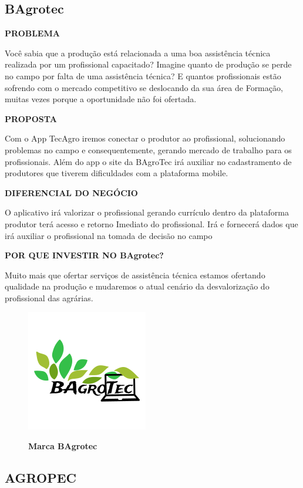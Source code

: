 \subsection{BAgrotec}

\textbf{PROBLEMA}

Você sabia que a produção está relacionada a uma boa assistência técnica realizada por um profissional capacitado? Imagine quanto de produção se perde no campo por falta de uma assistência técnica? E quantos profissionais estão sofrendo com o mercado competitivo se deslocando da sua área de Formação, muitas vezes porque a oportunidade não foi ofertada. 

\textbf{PROPOSTA}

Com o App TecAgro iremos conectar o produtor ao profissional, solucionando problemas no campo e consequentemente, gerando mercado de trabalho para os profissionais. Além do app o site da BAgroTec irá auxiliar no cadastramento de produtores que tiverem dificuldades com a plataforma mobile.  

\textbf{DIFERENCIAL DO NEGÓCIO}

O aplicativo irá valorizar o profissional gerando currículo dentro da plataforma  produtor terá acesso e retorno Imediato do profissional. Irá e fornecerá dados que irá auxiliar o profissional na tomada de decisão no campo

\textbf{POR QUE INVESTIR NO BAgrotec?}

Muito mais que ofertar serviços de assistência técnica estamos ofertando qualidade na produção e mudaremos o atual cenário da desvalorização do profissional das agrárias.

\begin{figure}[!htb]
\centering
\caption{\textbf{Marca BAgrotec}}
\includegraphics[scale=1.0]{Imagens/bagrotec.png}
\label{figura_15}
\end{figure}
\newpage


\subsection{AGROPEC}


